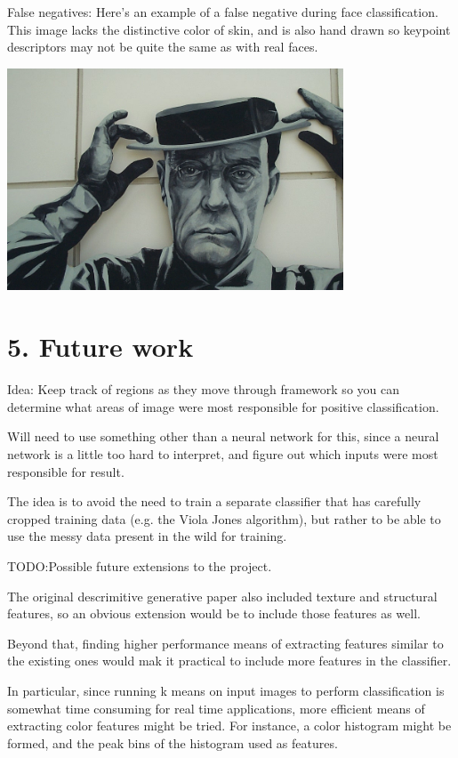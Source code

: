 \documentclass[11pt]{article}
\begin{document}
False negatives:
Here's an example of a false negative during face classification. This
image lacks the distinctive color of skin, and is also hand drawn so
keypoint descriptors may not be quite the same as with real faces.

\includegraphics[width=100mm]{images/face_false_negative.png}


\section{5. Future work}

Idea: Keep track of regions as they move through framework so you can
determine what areas of image were most responsible for positive
classification.

Will need to use something other than a neural network for this, since
a neural network is a little too hard to interpret, and figure out
which inputs were most responsible for result.

The idea is to avoid the need to train a separate classifier that has
carefully cropped training data (e.g. the Viola Jones algorithm), but
rather to be able to use the messy data present in the wild for
training.

TODO:Possible future extensions to the project.

The original descrimitive generative paper also included texture and
structural features, so an obvious extension would be to include those
features as well.

Beyond that, finding higher performance means of extracting features
similar to the existing ones would mak it practical to include more
features in the classifier.

In particular, since running k means on input images to perform
classification is somewhat time consuming for real time applications,
more efficient means of extracting color features might be tried. For
instance, a color histogram might be formed, and the peak bins of the
histogram used as features.
\end{document}
